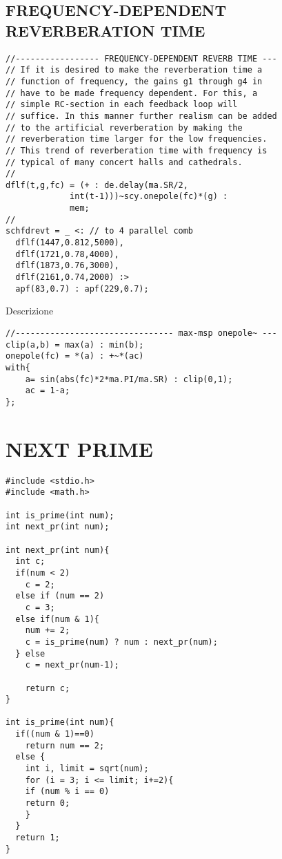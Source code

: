 \subsection*{FREQUENCY-DEPENDENT REVERBERATION TIME}
\begin{lstlisting}
//----------------- FREQUENCY-DEPENDENT REVERB TIME ---
// If it is desired to make the reverberation time a
// function of frequency, the gains g1 through g4 in
// have to be made frequency dependent. For this, a
// simple RC-section in each feedback loop will
// suffice. In this manner further realism can be added
// to the artificial reverberation by making the
// reverberation time larger for the low frequencies.
// This trend of reverberation time with frequency is
// typical of many concert halls and cathedrals.
//
dflf(t,g,fc) = (+ : de.delay(ma.SR/2,
             int(t-1)))~scy.onepole(fc)*(g) :
             mem;
//
schfdrevt = _ <: // to 4 parallel comb
  dflf(1447,0.812,5000),
  dflf(1721,0.78,4000),
  dflf(1873,0.76,3000),
  dflf(2161,0.74,2000) :>
  apf(83,0.7) : apf(229,0.7);
\end{lstlisting}

Descrizione

\begin{lstlisting}
//-------------------------------- max-msp onepole~ ---
clip(a,b) = max(a) : min(b);
onepole(fc) = *(a) : +~*(ac)
with{
    a= sin(abs(fc)*2*ma.PI/ma.SR) : clip(0,1);
    ac = 1-a;
};
\end{lstlisting}

\section*{NEXT PRIME}
\begin{lstlisting}
#include <stdio.h>
#include <math.h>

int is_prime(int num);
int next_pr(int num);

int next_pr(int num){
  int c;
  if(num < 2)
    c = 2;
  else if (num == 2)
    c = 3;
  else if(num & 1){
    num += 2;
    c = is_prime(num) ? num : next_pr(num);
  } else
    c = next_pr(num-1);

    return c;
}

int is_prime(int num){
  if((num & 1)==0)
    return num == 2;
  else {
    int i, limit = sqrt(num);
    for (i = 3; i <= limit; i+=2){
    if (num % i == 0)
    return 0;
    }
  }
  return 1;
}
\end{lstlisting}


